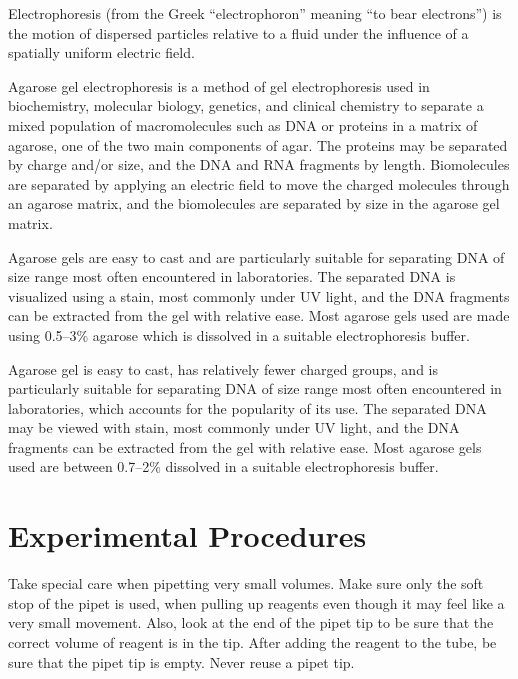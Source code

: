 \documentclass[]{book}
\let\BeginKnitrBlock\begin \let\EndKnitrBlock\end
\begin{document}
Electrophoresis (from the Greek ``electrophoron'' meaning ``to bear
electrons'') is the motion of dispersed particles relative to a fluid
under the influence of a spatially uniform electric field.

Agarose gel electrophoresis is a method of gel electrophoresis used in
biochemistry, molecular biology, genetics, and clinical chemistry to
separate a mixed population of macromolecules such as DNA or proteins in
a matrix of agarose, one of the two main components of agar. The
proteins may be separated by charge and/or size, and the DNA and RNA
fragments by length. Biomolecules are separated by applying an electric
field to move the charged molecules through an agarose matrix, and the
biomolecules are separated by size in the agarose gel matrix.

Agarose gels are easy to cast and are particularly suitable for
separating DNA of size range most often encountered in laboratories. The
separated DNA is visualized using a stain, most commonly under UV light,
and the DNA fragments can be extracted from the gel with relative ease.
Most agarose gels used are made using 0.5--3\% agarose which is
dissolved in a suitable electrophoresis buffer.

Agarose gel is easy to cast, has relatively fewer charged groups, and is
particularly suitable for separating DNA of size range most often
encountered in laboratories, which accounts for the popularity of its
use. The separated DNA may be viewed with stain, most commonly under UV
light, and the DNA fragments can be extracted from the gel with relative
ease. Most agarose gels used are between 0.7--2\% dissolved in a
suitable electrophoresis buffer.

\section{Experimental Procedures}\label{experimental-procedures-12}

\BeginKnitrBlock{rmdnote}
Take special care when pipetting very small volumes. Make sure only the
soft stop of the pipet is used, when pulling up reagents even though it
may feel like a very small movement. Also, look at the end of the pipet
tip to be sure that the correct volume of reagent is in the tip. After
adding the reagent to the tube, be sure that the pipet tip is empty.
Never reuse a pipet tip.
\EndKnitrBlock{rmdnote}
\end{document}
